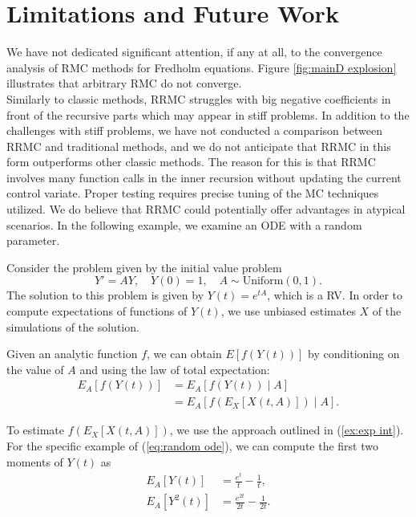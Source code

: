 \documentclass[a4paper,12pt]{article}
\begin{document}
\begin{pythonn} \label{py:nonlinear RRMC IVP}
\end{pythonn}


\section{Limitations and Future Work}

We have not dedicated significant attention, if any at all, to
the convergence analysis of RMC methods
for Fredholm equations. Figure \ref{fig:mainD explosion} illustrates
that arbitrary RMC do not converge. \\

Similarly to classic methods, RRMC struggles with big negative coefficients in front
of the recursive parts which may appear in
stiff problems.
In addition to the challenges with stiff problems, we have not conducted
a comparison between RRMC and traditional methods, and we do not anticipate
that RRMC in this form outperforms other classic methods.
The reason for this is that RRMC involves
many function calls in the inner recursion without updating the current control
variate. Proper testing requires precise tuning of the MC techniques utilized.
We do believe that RRMC could potentially offer advantages in atypical scenarios.
In the following example, we examine an ODE with a random parameter.

\begin{example} \label{ex:random ode}
    Consider the problem given by the initial value problem
    \begin{equation}\label{eq:random ode}
        Y' = AY, \quad Y(0)=1, \quad A \sim \text{Uniform}(0,1).
    \end{equation}
    The solution to this problem is given by
    $Y(t) = e^{tA}$, which is a RV.
    In order to compute expectations of functions of $Y(t)$,
    we use unbiased estimates $X$ of the simulations of the solution.

    Given an analytic function $f$, we can obtain $E[f(Y(t))]$
    by conditioning on the value of $A$ and using the
    law of total expectation:
    \begin{align}
        E_A[f(Y(t))] & = E_A[f(Y(t)) \mid A]         \\
                     & = E_A[f(E_X[X(t,A)]) \mid A].
    \end{align}

    To estimate $f(E_X[X(t,A)])$, we use the approach outlined in
    (\ref{ex:exp int}). For the specific example of (\ref{eq:random ode}),
    we can compute the first two moments of $Y(t)$ as
    \begin{align}
        E_A[Y(t)]   & = \frac{e^t}{t} - \frac{1}{t},      \\
        E_A[Y^2(t)] & = \frac{e^{2t}}{2t} - \frac{1}{2t}.
    \end{align}
\end{example}
\end{document}
